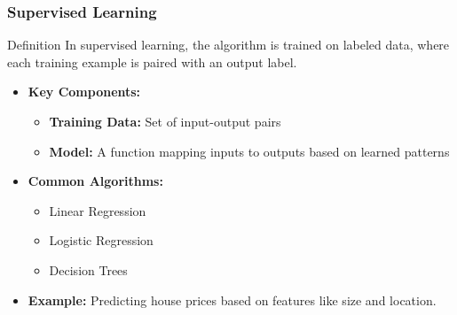 \documentclass{beamer}
\begin{document}
\begin{frame}[fragile]
    \frametitle{Supervised Learning}
    \begin{block}{Definition}
        In supervised learning, the algorithm is trained on labeled data, where each training example is paired with an output label.
    \end{block}
    
    \begin{itemize}
        \item \textbf{Key Components:}
            \begin{itemize}
                \item \textbf{Training Data:} Set of input-output pairs
                \item \textbf{Model:} A function mapping inputs to outputs based on learned patterns
            \end{itemize}
        
        \item \textbf{Common Algorithms:}
            \begin{itemize}
                \item Linear Regression
                \item Logistic Regression
                \item Decision Trees
            \end{itemize}
        
        \item \textbf{Example:} Predicting house prices based on features like size and location.
    \end{itemize}
\end{frame}
\end{document}
